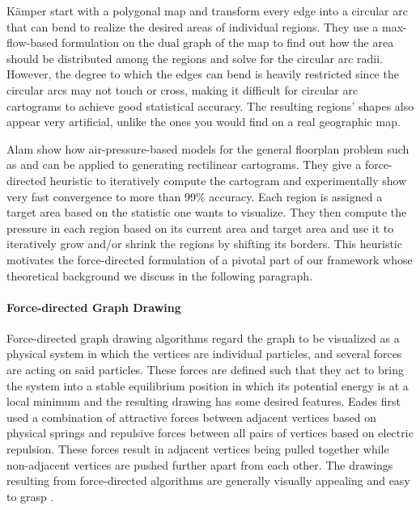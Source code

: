 Kämper \etal{} \cite{kamper2013circular} start with a polygonal map and transform every edge into a circular arc that can bend to realize the desired areas of individual regions.
They use a max-flow-based formulation on the dual graph of the map to find out how the area should be distributed among the regions and solve for the circular arc radii.
However, the degree to which the edges can bend is heavily restricted since the circular arcs may not touch or cross, making it difficult for circular arc cartograms to achieve good statistical accuracy.
The resulting regions' shapes also appear very artificial, unlike the ones you would find on a real geographic map.

Alam \etal{} \cite{alam2013computing} show how air-pressure-based models for the general floorplan problem such as \cite{izumi1998air} and \cite{felsner2013exploiting} can be applied to generating rectilinear cartograms.
They give a force-directed heuristic to iteratively compute the cartogram and experimentally show very fast convergence to more than 99\% accuracy.
Each region is assigned a target area based on the statistic one wants to visualize.
They then compute the pressure in each region based on its current area and target area and use it to iteratively grow and/or shrink the regions by shifting its borders.
This heuristic motivates the force-directed formulation of a pivotal part of our framework whose theoretical background we discuss in the following paragraph.


\paragraph{Force-directed Graph Drawing}

Force-directed graph drawing algorithms regard the graph to be visualized as a physical system in which the vertices are individual particles, and several forces are acting on said particles.
These forces are defined such that they act to bring the system into a stable equilibrium position in which its potential energy is at a local minimum and the resulting drawing has some desired features.
Eades \cite{eades84heuristic} first used a combination of attractive forces between adjacent vertices based on physical springs and repulsive forces between all pairs of vertices based on electric repulsion.
These forces result in adjacent vertices being pulled together while non-adjacent vertices are pushed further apart from each other.
The drawings resulting from force-directed algorithms are generally visually appealing and easy to grasp \cite{kobourov2013force}.

